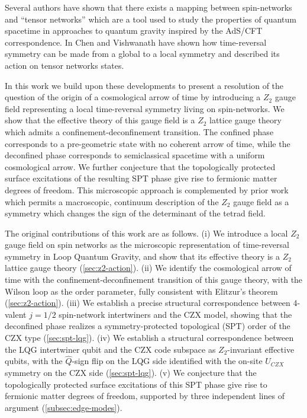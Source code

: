 \documentclass[preprint]{SciPost}
\theoremstyle{plain} %
\begin{document}
Several authors \cite{Qi2013Exact,Han2016Loop,Chirco2018Group,Colafranceschi2021Holographic,Chirco2022Quantum} have shown that there exists a mapping between spin-networks and ``tensor networks'' which are a tool used to study the properties of quantum spacetime in approaches to quantum gravity inspired by the AdS/CFT correspondence. In \cite{Chen2015Gauging} Chen and Vishwanath have shown how time-reversal symmetry can be made from a global to a local symmetry and described its action on tensor networks states.

In this work we build upon these developments to present a resolution of the question of the origin of a cosmological arrow of time by introducing a $ Z_2 $ gauge field representing a local time-reversal symmetry living on spin-networks. We show that the effective theory of this gauge field is a $ Z_2 $ lattice gauge theory which admits a confinement-deconfinement transition. The confined phase corresponds to a pre-geometric state with no coherent arrow of time, while the deconfined phase corresponds to semiclassical spacetime with a uniform cosmological arrow. We further conjecture that the topologically protected surface excitations of the resulting SPT phase give rise to fermionic matter degrees of freedom. This microscopic approach is complemented by prior work \cite{Christodoulou2012How-to-detect,Rovelli2012Discrete} which permits a macroscopic, continuum description of the $ Z_2 $ gauge field as a symmetry which changes the sign of the determinant of the tetrad field.

The original contributions of this work are as follows. (i) We introduce a local $ Z_2 $ gauge field on spin networks as the microscopic representation of time-reversal symmetry in Loop Quantum Gravity, and show that its effective theory is a $ Z_2 $ lattice gauge theory (\autoref{sec:z2-action}). (ii) We identify the cosmological arrow of time with the confinement-deconfinement transition of this gauge theory, with the Wilson loop as the order parameter, fully consistent with Elitzur's theorem (\autoref{sec:z2-action}). (iii) We establish a precise structural correspondence between 4-valent $ j=1/2 $ spin-network intertwiners and the CZX model, showing that the deconfined phase realizes a symmetry-protected topological (SPT) order of the CZX type (\autoref{sec:spt-lqg}). (iv) We establish a structural correspondence between the LQG intertwiner qubit and the CZX code subspace as $Z_2$-invariant effective qubits, with the $ \hat{Q} $-sign flip on the LQG side identified with the on-site $ U_{CZX} $ symmetry on the CZX side (\autoref{sec:spt-lqg}). (v) We conjecture that the topologically protected surface excitations of this SPT phase give rise to fermionic matter degrees of freedom, supported by three independent lines of argument (\autoref{subsec:edge-modes}).
\end{document}
